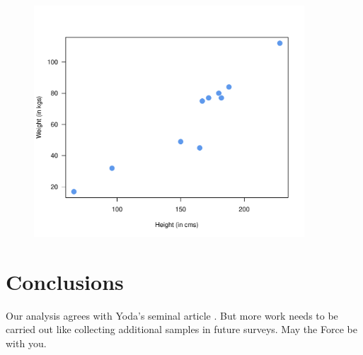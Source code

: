 \documentclass{article}\usepackage[]{graphicx}\usepackage[]{color}
\begin{document}
\begin{figure}[h!]
    \centering
	\includegraphics[width=0.9\textwidth]{../images/scatterplot.pdf}
\end{figure}

\section{Conclusions}
Our analysis agrees with Yoda's seminal article \cite{yoda}. But more work needs to be carried out like collecting additional samples in future surveys. May the Force be with you.


\printbibliography
\end{document}
